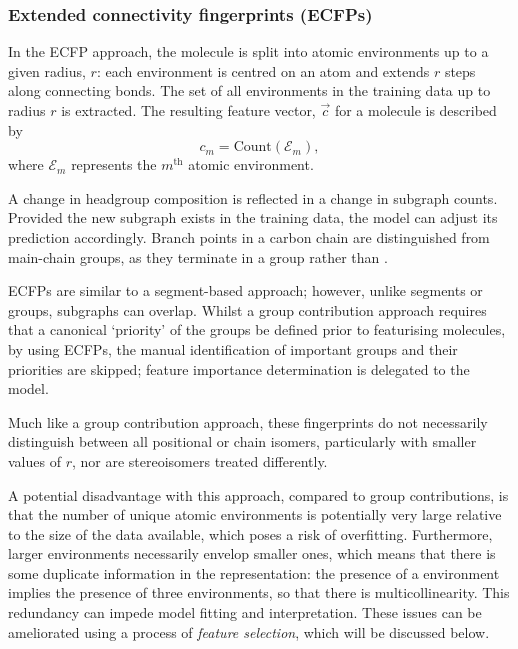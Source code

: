 \subsubsection{Extended connectivity fingerprints (ECFPs)}

In the ECFP approach, the molecule is split into atomic environments up to a
given radius, $r$: each environment is centred on an atom and extends $r$ steps
along connecting bonds. The set of all environments in the training data up to
radius $r$ is extracted. The resulting feature vector, $\vec{c}$ for a molecule
is described by
\begin{equation}
    \label{eq:ecfp}
    c_m = \text{Count}(\mathcal{E}_m),
\end{equation}
where $\mathcal{E}_m$ represents the $m^\text{th}$ atomic environment.

A change in headgroup composition is reflected in a change in subgraph counts.
Provided the new subgraph exists in the training data, the model can adjust its
prediction accordingly. Branch points in a carbon chain are distinguished from
main-chain groups, as they terminate in a  group rather than .

ECFPs are similar to a segment-based approach; however, unlike segments or
groups, subgraphs can overlap. Whilst a group contribution approach requires
that a canonical `priority' of the groups be defined prior to featurising
molecules, by using ECFPs, the manual identification of important groups and
their priorities are skipped; feature importance determination is delegated to
the model.

Much like a group contribution approach, these fingerprints do not necessarily
distinguish between all positional or chain isomers, particularly with smaller
values of $r$, nor are stereoisomers treated differently.

A potential disadvantage with this approach, compared to group contributions, is
that the number of unique atomic environments is potentially very large relative
to the size of the data available, which poses a risk of overfitting.
Furthermore, larger environments necessarily envelop smaller ones, which means
that there is some duplicate information in the representation: the presence of
a  environment implies the presence of three  environments,
so that there is multicollinearity. This redundancy can impede model fitting and
interpretation. These issues can be ameliorated using a process of
\emph{feature selection}, which will be discussed below.

